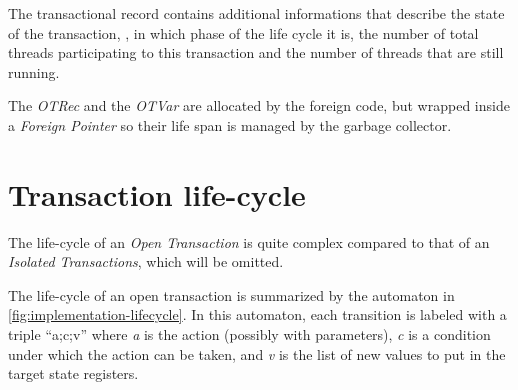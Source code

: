 The transactional record contains additional informations that describe the state of the transaction, \ie, in which phase of the life cycle it is, the number of total threads participating to this transaction and the number of threads that are still running.

The \emph{OTRec} and the \emph{OTVar} are allocated by the foreign code, but wrapped inside a \emph{Foreign Pointer} so their life span is managed by the garbage collector.

\section{Transaction life-cycle}

The life-cycle of an \emph{Open Transaction} is quite complex compared to that of an \emph{Isolated Transactions}, which will be omitted.

The life-cycle of an open transaction is summarized by the automaton in \cref{fig:implementation-lifecycle}.
In this automaton, each transition is labeled with a triple ``a;c;v'' where \emph{a} is the action (possibly with parameters), \emph{c} is a condition under which the action can be taken, and \emph{v} is the list of new values to put in the target state registers.

